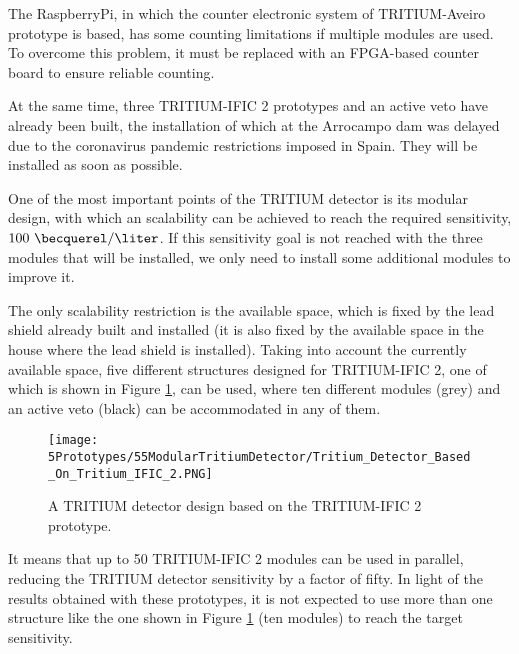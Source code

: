 The RaspberryPi, in which the counter electronic system of TRITIUM-Aveiro prototype is based, has some counting limitations if multiple modules are used. To overcome this problem, it must be replaced with an FPGA-based counter board to ensure reliable counting.

At the same time, three TRITIUM-IFIC 2 prototypes and an active veto have already been built, the installation of which at the Arrocampo dam was delayed due to the coronavirus pandemic restrictions imposed in Spain. They will be installed as soon as possible.

One of the most important points of the TRITIUM detector is its modular design, with which an scalability can be achieved to reach the required sensitivity, $100~\becquerel/\liter$.  If this sensitivity goal is not reached with the three modules that will be installed, we only need to install some additional modules to improve it.

The only scalability restriction is the available space, which is fixed by the lead shield already built and installed (it is also fixed by the available space in the house where the lead shield is installed). Taking into account the currently available space, five different structures designed for TRITIUM-IFIC 2, one of which is shown in Figure \ref{fig:TritiumMonitorIFIC2Design}, can be used, where ten different modules (grey) and an active veto (black) can be accommodated in any of them. 

\begin{figure}[h]
\centering
\texttt{[image: 5Prototypes/55ModularTritiumDetector/Tritium\_Detector\_Based\_On\_Tritium\_IFIC\_2.PNG]}
\caption{A TRITIUM detector design based on the TRITIUM-IFIC 2 prototype.\label{fig:TritiumMonitorIFIC2Design}}
\end{figure}

It means that up to 50 TRITIUM-IFIC 2 modules can be used in parallel, reducing the TRITIUM detector sensitivity by a factor of fifty. In light of the results obtained with these prototypes, it is not expected to use more than one structure like the one shown in Figure \ref{fig:TritiumMonitorIFIC2Design} (ten modules) to reach the target sensitivity.